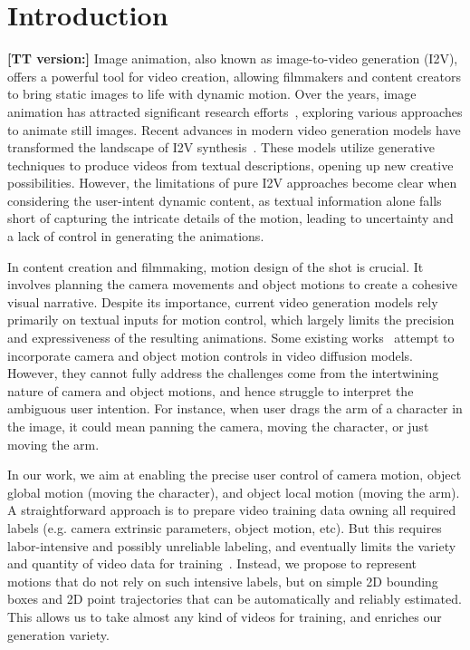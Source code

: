 

\section{Introduction}
\label{sec-1-intro}

{\bf [TT version:]} Image animation, also known as image-to-video generation (I2V), offers a powerful tool for video creation, allowing filmmakers and content creators 
to bring static images to life with dynamic motion. 
Over the years, image animation has attracted significant research efforts~\cite{horrytour, xuanimating,niklaus3d,liuinfinite, holynski2021animating}, exploring various approaches to animate still images.
Recent advances in modern video generation models have transformed the landscape of I2V 
synthesis~\cite{xing2023dynamicrafter,yang2024cogvideox}. These models utilize generative techniques 
to produce videos from textual descriptions, opening up new creative possibilities. However, the limitations of pure I2V approaches become clear when considering the user-intent dynamic content, as textual information alone falls short of 
capturing the intricate details of the motion, leading to uncertainty and a lack of control in generating the animations.

In content creation and filmmaking, motion design of the shot is crucial. It involves planning the camera movements and object motions to create a cohesive visual narrative. Despite its importance, current video generation models rely primarily on textual inputs for motion control, which largely limits the precision and expressiveness of the resulting animations. Some existing works~\cite{wang2024motionctrl,wu2025draganything} attempt to incorporate camera and object motion controls in video diffusion models.
However, they cannot fully address the challenges come from the intertwining nature of camera and object motions, and hence struggle to interpret the ambiguous user intention. For instance, when user drags the arm of a character in the image, it could mean panning the camera, moving the character, or just moving the arm. 

In our work, we aim at enabling the precise user control of camera motion, object global motion (moving the character), and object local motion (moving the arm). 
A straightforward approach is to prepare video training data owning all required labels (e.g. camera extrinsic parameters, object motion, etc). 
But this requires labor-intensive and possibly unreliable labeling, and eventually limits the variety and quantity of video data for training~\cite{wang2024motionctrl,he2024cameractrl}. 
Instead, we propose to represent motions that do not rely on such intensive labels, but on simple 2D bounding boxes and 2D point trajectories that can be automatically and reliably estimated. 
This allows us to take almost any kind of videos for training, and enriches our generation variety.

